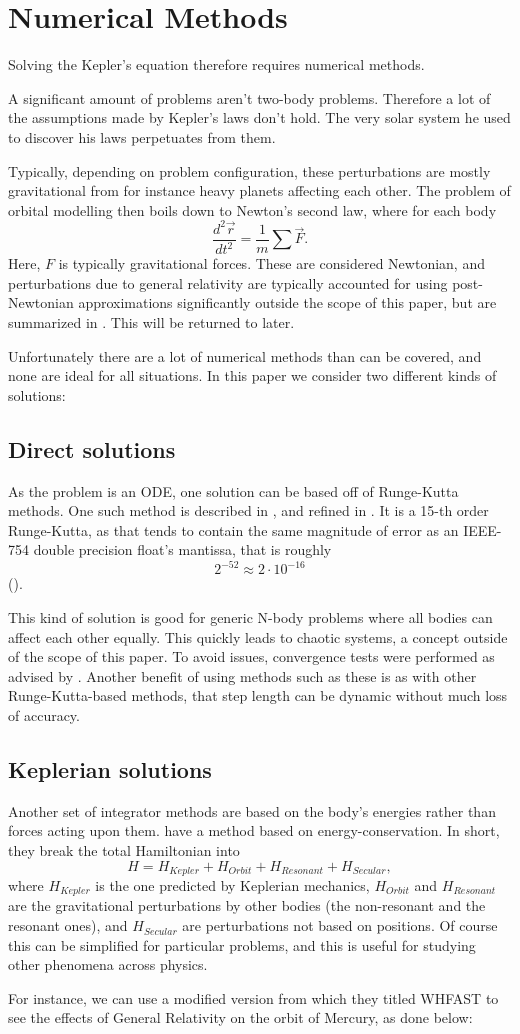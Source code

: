 \section{Numerical Methods}
Solving the Kepler's equation therefore requires numerical methods.

A significant amount of problems aren't two-body problems. Therefore a lot of the assumptions made by Kepler's laws don't hold. The very solar system he used to discover his laws perpetuates from them.

Typically, depending on problem configuration, these perturbations are mostly gravitational from for instance heavy planets affecting each other. The problem of orbital modelling then boils down to Newton's second law, where for each body
\[
    \frac{d^2\vec r}{dt^2} = \frac1m \sum \vec F.
\]
Here, $F$ is typically gravitational forces. These are considered Newtonian, and perturbations due to general relativity are typically accounted for using post-Newtonian approximations significantly outside the scope of this paper, but are summarized in \cite{Phillipp_2018}. This will be returned to later.

Unfortunately there are a lot of numerical methods than can be covered, and none are ideal for all situations. In this paper we consider two different kinds of solutions:

\subsection{Direct solutions}
As the problem is an ODE, one solution can be based off of Runge-Kutta methods. One such method is described in \cite{Everhart_1985}, and refined in \cite{Rein_2014}. It is a 15-th order Runge-Kutta, as that tends to contain the same magnitude of error as an IEEE-754 double precision float's mantissa, that is roughly \[
    2^{-52} \approx 2\cdot10^{-16}
\]
(\cite{IEEE-754}).

This kind of solution is good for generic N-body problems where all bodies can affect each other equally. This quickly leads to chaotic systems, a concept outside of the scope of this paper. To avoid issues, convergence tests were performed as advised by \cite{Rein_2014}. Another benefit of using methods such as these is as with other Runge-Kutta-based methods, that step length can be dynamic without much loss of accuracy.

\subsection{Keplerian solutions}
Another set of integrator methods are based on the body's energies rather than forces acting upon them. \cite{Wisdom_1991} have a method based on energy-conservation. In short, they break the total Hamiltonian into
\[
    H = H_{Kepler} + H_{Orbit} + H_{Resonant} + H_{Secular},
\]
where $H_{Kepler}$ is the one predicted by Keplerian mechanics, $H_{Orbit}$ and $H_{Resonant}$ are the gravitational perturbations by other bodies (the non-resonant and the resonant ones), and $H_{Secular}$ are perturbations not based on positions. Of course this can be simplified for particular problems, and this is useful for studying other phenomena across physics.

For instance, we can use a modified version from \cite{Rein_2015} which they titled WHFAST to see the effects of General Relativity on the orbit of Mercury, as done below: